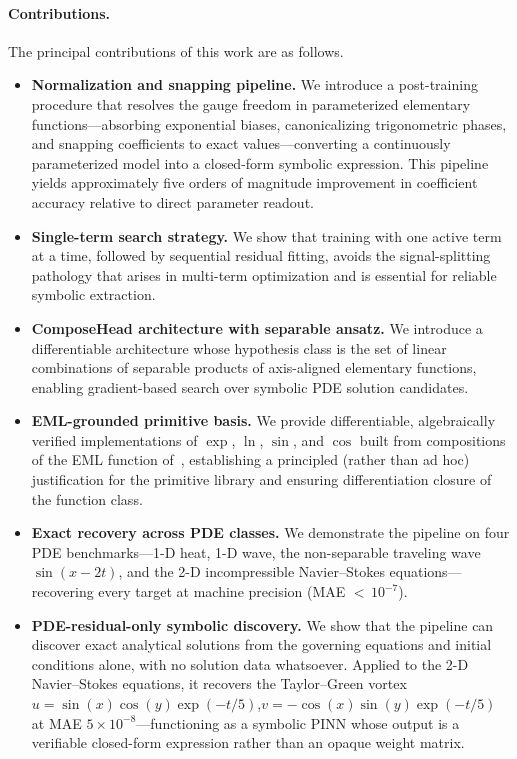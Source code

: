 \paragraph{Contributions.}
The principal contributions of this work are as follows.
\begin{itemize}
  \item \textbf{Normalization and snapping pipeline.}  We introduce a
    post-training procedure that resolves the gauge freedom in parameterized
    elementary functions---absorbing exponential biases, canonicalizing
    trigonometric phases, and snapping coefficients to exact values---converting
    a continuously parameterized model into a closed-form symbolic expression.
    This pipeline yields approximately five orders of magnitude improvement in
    coefficient accuracy relative to direct parameter readout.

  \item \textbf{Single-term search strategy.}  We show that training with one
    active term at a time, followed by sequential residual fitting, avoids the
    signal-splitting pathology that arises in multi-term optimization and is
    essential for reliable symbolic extraction.

  \item \textbf{ComposeHead architecture with separable ansatz.}  We introduce a
    differentiable architecture whose hypothesis class is the set of linear
    combinations of separable products of axis-aligned elementary functions,
    enabling gradient-based search over symbolic PDE solution candidates.

  \item \textbf{EML-grounded primitive basis.}  We provide differentiable,
    algebraically verified implementations of $\exp$, $\ln$, $\sin$, and $\cos$
    built from compositions of the EML function of~\cite{odrzywołek2026},
    establishing a principled (rather than ad hoc) justification for the
    primitive library and ensuring differentiation closure of the function class.

  \item \textbf{Exact recovery across PDE classes.}  We demonstrate the
    pipeline on four PDE benchmarks---1-D heat, 1-D wave, the non-separable
    traveling wave $\sin(x-2t)$, and the 2-D incompressible Navier--Stokes
    equations---recovering every target at machine precision (MAE ${<}\,10^{-7}$).

  \item \textbf{PDE-residual-only symbolic discovery.}  We show that the
    pipeline can discover exact analytical solutions from the governing
    equations and initial conditions alone, with no solution data whatsoever.
    Applied to the 2-D Navier--Stokes equations, it recovers the Taylor--Green
    vortex $u = \sin(x)\cos(y)\exp(-t/5)$,\;$v = -\cos(x)\sin(y)\exp(-t/5)$
    at MAE $5\times 10^{-8}$---functioning as a symbolic PINN whose output is
    a verifiable closed-form expression rather than an opaque weight matrix.
\end{itemize}

